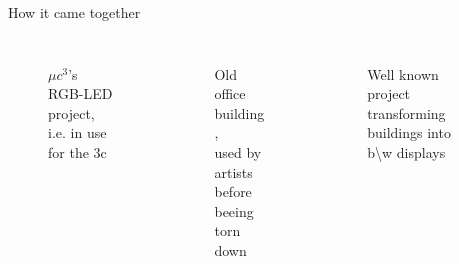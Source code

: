 \documentclass{beamer}
\begin{document}
\begin{frame}{How it came together}
\begin{columns}
\begin{column}{3.5cm}
\begin{figure}
\begin{center}
          \end{center}
        \end{figure}
\end{column}
\end{columns}
\begin{columns}[T]
\begin{column}{3.5cm}
        \begin{figure}
          \begin{center}
          $\mu c^3$'s RGB-LED project, i.e. in use for the 3c
          \end{center}
        \end{figure}

\end{column}
\begin{column}{3.5cm}
        \begin{figure}
          \begin{center}
          Old office building,\\used by artists before beeing torn down
          \end{center}
        \end{figure}

\end{column}
\begin{column}{3.5cm}
        \begin{figure}
          \begin{center}
          Well known project transforming buildings into b\textbackslash w displays
          \end{center}
        \end{figure}

    \end{column}
\end{columns}
\end{frame}
\end{document}
